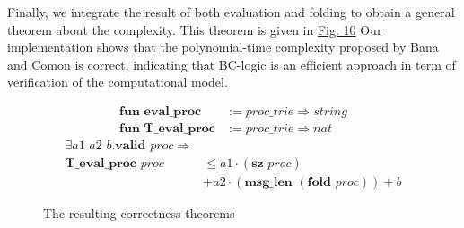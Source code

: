 \documentclass[conference]{IEEEtran}
\begin{document}
Finally, we integrate the result of both evaluation and folding to obtain a general theorem about the complexity. This theorem is given in \hyperref[figure:10]{Fig. 10} Our implementation shows that the polynomial-time complexity proposed by Bana and Comon is correct, indicating that BC-logic is an efficient approach in term of verification of the computational model. \\
\begin{figure}
\centering
\begin{align}
    \textbf{fun eval\_proc} &:= \textit{proc\_trie} \Rightarrow \textit{string} \nonumber\\
    \textbf{fun T\_eval\_proc} &:= \textit{proc\_trie} \Rightarrow \textit{nat} \nonumber
\end{align}
\begin{align}
     \exists \textit{a1 a2 b}. \textbf{valid } \textit{proc} \Longrightarrow& \nonumber\\ 
     \textbf{T\_eval\_proc} \textit{ proc}  &\leq a1 \cdot (\textbf{sz } \textit{proc})\nonumber\\
     &+ a2 \cdot (\textbf{msg\_len } (\textbf{fold } \textit{proc})) + b\nonumber
\end{align}
\caption{The resulting correctness theorems}
\label{figure:10}
\end{figure}
\end{document}
